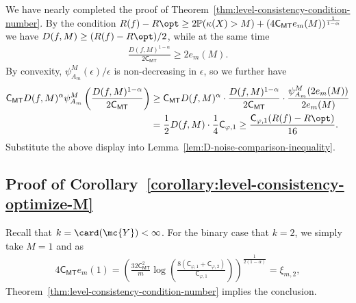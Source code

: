 \documentclass[11pt]{article}
\newcommand{\Prb}{\mathbb{P}}
\newcommand{\prn}[1]{\left({#1}\right)} %
\newcommand{\constant}{\mathsf{C}}  %
\newcommand{\cstMT}{\constant_{\mathsf{MT}}}
\newcommand{\sloss}{\varphi}  %
\begin{document}
We have nearly completed the proof of
Theorem~\ref{thm:level-consistency-condition-number}.
%
By the condition $R(f) - R\opt \geq 2\Prb(\kappa(X) > M) + (4\cstMT
e_m(M))^{\frac{1}{1-\alpha}}$ we have $D(f, M) \geq (R(f) - R\opt)/2$, while
at the same time
\begin{align*}
  \frac{D(f, M)^{1-\alpha}}{2 \cstMT} \geq 2 e_m(M).
\end{align*}
By convexity, $\psi_{A_m}^M(\epsilon)/\epsilon$ is non-decreasing in
$\epsilon$, so we further have
\begin{align*}
  \cstMT D(f, M)^\alpha \psi_{A_m}^M \prn{\frac{D(f,M)^{1-\alpha}}{2\cstMT}} & \geq \cstMT D(f, M)^\alpha \cdot \frac{D(f,M)^{1-\alpha}}{2\cstMT} \cdot \frac{\psi_{A_m}^M (2 e_m(M))}{2e_m(M)} \nonumber \\
  & = \frac{1}{2} D(f,M) \cdot \frac{1}{4} \constant_{\sloss, 1} \geq \frac{\constant_{\sloss, 1} (R(f) - R\opt)}{16}.
\end{align*}
Substitute the above display into
Lemma~\ref{lem:D-noise-comparison-inequality}.

\subsection{Proof of Corollary~\ref{corollary:level-consistency-optimize-M}}
\label{proof:level-consistency-optimize-M}

Recall that $k = \card(\mc{Y}) < \infty$.
%
For the binary case that $k=2$, we simply take $M=1$ and as
\begin{align*}
  4\cstMT e_m(1) = \prn{\frac{32 \cstMT^2}{m}\log \prn{ \frac{8(\constant_{\sloss, 1}+\constant_{\sloss, 2})}{\constant_{\sloss, 1}}}}^{\frac{1}{2(1-\alpha)}} =
  \xi_{m,2},
\end{align*}
Theorem~\ref{thm:level-consistency-condition-number} implies the conclusion.
\end{document}
